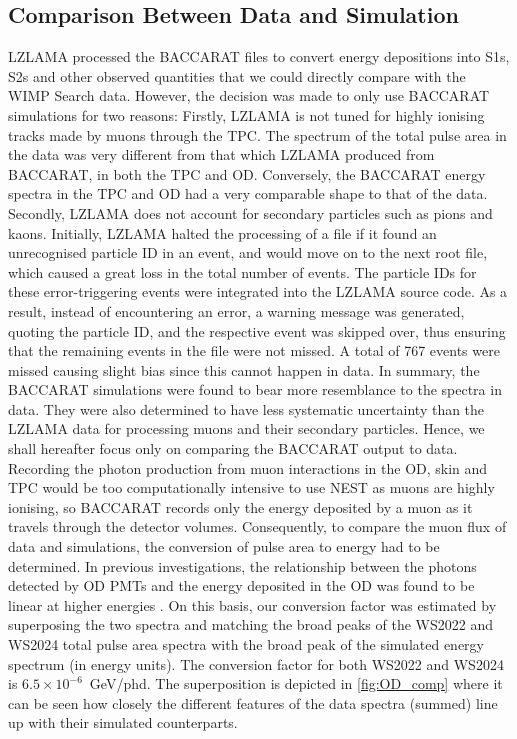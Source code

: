 \subsection{Comparison Between Data and Simulation}
LZLAMA processed the BACCARAT files to convert energy depositions into S1s, S2s and other observed quantities that we could directly compare with the WIMP Search data. However, the decision was made to only use BACCARAT simulations for two reasons: Firstly, LZLAMA is not tuned for highly ionising tracks made by muons through the TPC. The spectrum of the total pulse area in the data was very different from that which LZLAMA produced from BACCARAT, in both the TPC and OD. Conversely, the BACCARAT energy spectra in the TPC and OD had a very comparable shape to that of the data. Secondly, LZLAMA does not account for secondary particles such as pions and kaons. Initially, LZLAMA halted the processing of a file if it found an unrecognised particle ID in an event, and would move on to the next root file, which caused a great loss in the total number of events. The particle IDs for these error-triggering events were integrated into the LZLAMA source code. As a result, instead of encountering an error, a warning message was generated, quoting the particle ID, and the respective event was skipped over, thus ensuring that the remaining events in the file were not missed. A total of 767 events were missed causing slight bias since this cannot happen in data. In summary, the BACCARAT simulations were found to bear more resemblance to the spectra in data. They were also determined to have less systematic uncertainty than the LZLAMA data for processing muons and their secondary particles. Hence, we shall hereafter focus only on comparing the BACCARAT output to data. \\

Recording the photon production from muon interactions in the OD, skin and TPC would be too computationally intensive to use NEST as muons are highly ionising, so BACCARAT records only the energy deposited by a muon as it travels through the detector volumes. Consequently, to compare the muon flux of data and simulations, the conversion of pulse area to energy had to be determined. In previous investigations, the relationship between the photons detected by OD PMTs and the energy deposited in the OD was found to be linear at higher energies \cite{OD_linear}. On this basis, our conversion factor was estimated by superposing the two spectra and matching the broad peaks of the WS2022 and WS2024 total pulse area spectra with the broad peak of the simulated energy spectrum (in energy units). The conversion factor for both WS2022 and WS2024 is $6.5\times10^{-6}$~GeV/phd. The superposition is depicted in \autoref{fig:OD_comp} where it can be seen how closely the different features of the data spectra (summed) line up with their simulated counterparts.

